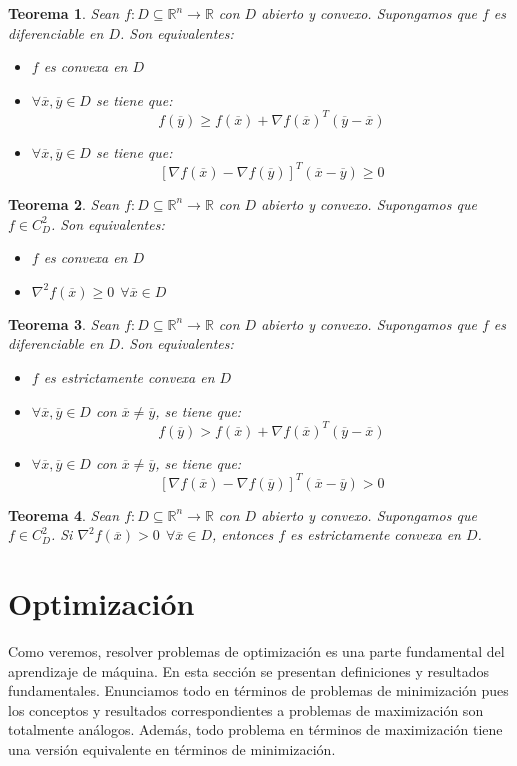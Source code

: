 \documentclass[11pt]{report}
\newtheorem{theorem}{Teorema}[section]
\newcommand{\Rn}{\mathbb{R}^{n}}
\newcommand{\R}{\mathbb{R}}
\newcommand{\x}{\overline{x}}
\newcommand{\y}{\overline{y}}
\begin{document}
\begin{theorem}
Sean $f:D\subseteq\Rn\rightarrow\R$ con $D$ abierto y convexo. Supongamos que $f$ es diferenciable en $D$. Son equivalentes:
\begin{itemize}
\item[(i)] $f$ es convexa en $D$
\item[(ii)] $\forall\x,\y\in D$ se tiene que: $$f(\y)\geq f(\x)+\nabla f(\x)^{T}(\y - \x)$$
\item[(iii)] $\forall\x,\y\in D$ se tiene que: $$[\nabla f(\x)-\nabla f(\y)]^{T}(\x-\y)\geq0$$
\end{itemize}
\end{theorem}

\begin{theorem}
Sean $f:D\subseteq\Rn\rightarrow\R$ con $D$ abierto y convexo. Supongamos que $f\in C_{D}^{2}$. Son equivalentes:
\begin{itemize}
\item[(i)] $f$ es convexa en $D$
\item[(ii)] $\nabla^{2}f(\x)\geq0\ \ \forall\x\in D$
\end{itemize}
\end{theorem}

\begin{theorem}
Sean $f:D\subseteq\Rn\rightarrow\R$ con $D$ abierto y convexo. Supongamos que $f$ es diferenciable en $D$. Son equivalentes:
\begin{itemize}
\item[(i)] $f$ es estrictamente convexa en $D$
\item[(ii)] $\forall\x,\y\in D$ con $\x\ne\y$, se tiene que: $$f(\y)> f(\x)+\nabla f(\x)^{T}(\y - \x)$$
\item[(iii)] $\forall\x,\y\in D$ con $\x\ne\y$, se tiene que: $$[\nabla f(\x)-\nabla f(\y)]^{T}(\x-\y)>0$$
\end{itemize}
\end{theorem}

\begin{theorem}
Sean $f:D\subseteq\Rn\rightarrow\R$ con $D$ abierto y convexo. Supongamos que $f\in C_{D}^{2}$.
Si $\nabla^{2}f(\x)>0\ \ \forall\x\in D$, entonces $f$ es estrictamente convexa en $D$.
\end{theorem}
\chapter{Optimización}
Como veremos, resolver problemas de optimización  es una parte fundamental del aprendizaje de máquina. En esta sección se presentan definiciones y resultados fundamentales. Enunciamos todo en términos de problemas de minimización pues los conceptos y resultados correspondientes a problemas de maximización son totalmente análogos. Además, todo problema en términos de maximización tiene una versión equivalente en términos de minimización.
\end{document}
